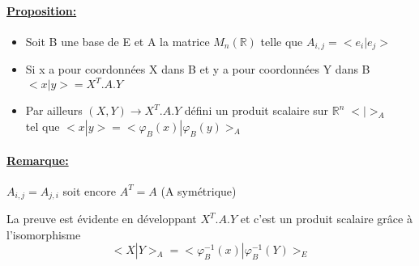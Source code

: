 \documentclass{article}
\begin{document}
\paragraph{\underline{Proposition:}}
\begin{itemize}
    \item Soit B une base de E et A la matrice $M_n(\mathbb{R})$ telle que $A_{i,j} = <e_i | e_j>$
    \item Si x a pour coordonnées X dans B et y a pour coordonnées Y dans B $<x|y> = X^T . A . Y$
    \item Par ailleurs $(X, Y) \rightarrow X^T . A . Y$ défini un produit scalaire sur $\mathbb{R}^n \; <|>_A$ \\
tel que $<x|y> = <\varphi_B(x)|\varphi_B(y)>_A$
\end{itemize}

\paragraph{\underline{Remarque:}} $A_{i, j} = A_{j, i}$ soit encore $A^T = A$ (A symétrique)

La preuve est évidente en développant $X^T . A . Y$ et c'est un produit scalaire grâce à l'isomorphisme
$$<X|Y>_A = <\varphi_B^{-1}(x) | \varphi_B^{-1}(Y)>_E$$
\end{document}
